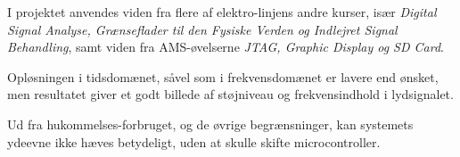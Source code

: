 I projektet anvendes viden fra flere af elektro-linjens andre kurser, især \textit{Digital Signal Analyse, Grænseflader til den Fysiske Verden og Indlejret Signal Behandling}, samt viden fra AMS-øvelserne \textit{JTAG, Graphic Display og SD Card}.

Opløsningen i tidsdomænet, såvel som i frekvensdomænet er lavere end ønsket, men resultatet giver et godt billede af støjniveau og frekvensindhold i lydsignalet. 

Ud fra hukommelses-forbruget, og de øvrige begrænsninger, kan systemets ydeevne ikke hæves betydeligt, uden at skulle skifte microcontroller. 
 
